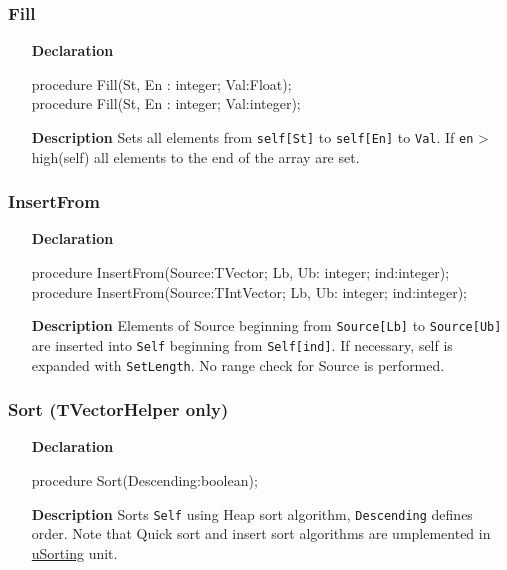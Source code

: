 \documentclass[12pt,a4paper,oneside]{report}
\newcommand{\declarationitem}[1]{\textbf{#1}}
\newcommand{\descriptiontitle}[1]{\textbf{#1}}
\newcommand{\code}[1]{\texttt{#1}}
\begin{document}
\subsubsection{Fill}
\begin{itemize}
	\item[\declarationitem{Declaration}\hfill]
	\begin{flushleft}
		     procedure Fill(St, En : integer; Val:Float);\\ \vspace{4pt}
		     procedure Fill(St, En : integer; Val:integer);
	\end{flushleft}
	\item[\descriptiontitle{Description}\hfill]
	Sets all elements from \code{self[St]} to \code{self[En]} to \code{Val}. If \code{en} > high(self) all elements to the end of the array are set.
\end{itemize}
\subsubsection{InsertFrom}
\begin{itemize}
	\item[\declarationitem{Declaration}\hfill]
	\begin{flushleft}
     procedure InsertFrom(Source:TVector; Lb, Ub: integer; ind:integer);\\ \vspace{4pt}
     procedure InsertFrom(Source:TIntVector; Lb, Ub: integer; ind:integer);
	\end{flushleft}
	\item[\descriptiontitle{Description}\hfill]
Elements of Source beginning from \code{Source[Lb]} to \code{Source[Ub]} are inserted into \code{Self} beginning from \code{Self[ind]}. If necessary, self is expanded with \code{SetLength}. No range check for Source is performed.	
\end{itemize}
\subsubsection{Sort (TVectorHelper only)}
\begin{itemize}
	\item[\declarationitem{Declaration}\hfill]
	\begin{flushleft}
     procedure Sort(Descending:boolean);
	\end{flushleft}
	\item[\descriptiontitle{Description}\hfill]
	Sorts \code{Self} using Heap sort algorithm, \code{Descending} defines order. Note that Quick sort and insert sort algorithms are umplemented in \hyperref[usorting]{uSorting} unit.
\end{itemize}
\end{document}
